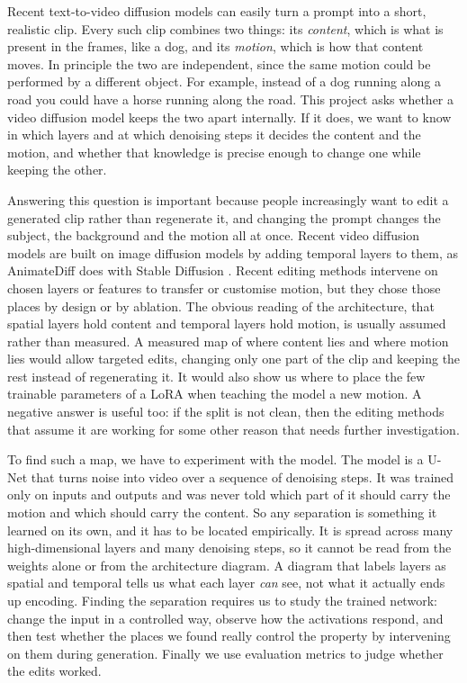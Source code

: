 \documentclass[twoside,english]{article}
\begin{document}
Recent text-to-video diffusion models can easily turn a prompt into a short, realistic clip. Every
such clip combines two things: its \emph{content}, which is what is present in the frames, like a
dog, and its \emph{motion}, which is how that content moves. In principle the two are independent,
since the same motion could be performed by a different object. For example, instead of a dog
running along a road you could have a horse running along the road. This project asks whether a
video diffusion model keeps the two apart internally. If it does, we want to know in which layers
and at which denoising steps it decides the content and the motion, and whether that knowledge is
precise enough to change one while keeping the other.

Answering this question is important because people increasingly want to edit a generated clip
rather than regenerate it, and changing the prompt changes the subject, the background and the
motion all at once. Recent video diffusion models are built on image diffusion models by adding
temporal layers to them, as AnimateDiff \citep{guo2024animatediff} does with Stable Diffusion
\citep{rombach2022ldm}. Recent editing methods
\citep{wu2023tav,zhao2024motiondirector,ling2025motionclone,xiao2024moft} intervene on chosen layers
or features to transfer or customise motion, but they chose those places by design or by ablation.
The obvious reading of the architecture, that spatial layers hold content and temporal layers hold
motion, is usually assumed rather than measured. A measured map of where content lies and where
motion lies would allow targeted edits, changing only one part of the clip and keeping the rest
instead of regenerating it. It would also show us where to place the few trainable parameters of a
LoRA \citep{hu2022lora} when teaching the model a new motion. A negative answer is useful too: if the
split is not clean, then the editing methods that assume it are working for some other reason that
needs further investigation.

To find such a map, we have to experiment with the model. The model is a U-Net that turns noise into
video over a sequence of denoising steps. It was trained only on inputs and outputs and was never
told which part of it should carry the motion and which should carry the content. So any separation
is something it learned on its own, and it has to be located empirically. It is spread across many
high-dimensional layers and many denoising steps, so it cannot be read from the weights alone or
from the architecture diagram. A diagram that labels layers as spatial and temporal tells us what
each layer \emph{can} see, not what it actually ends up encoding. Finding the separation requires us
to study the trained network: change the input in a controlled way, observe how the activations
respond, and then test whether the places we found really control the property by intervening on
them during generation. Finally we use evaluation metrics to judge whether the edits worked.
\end{document}
